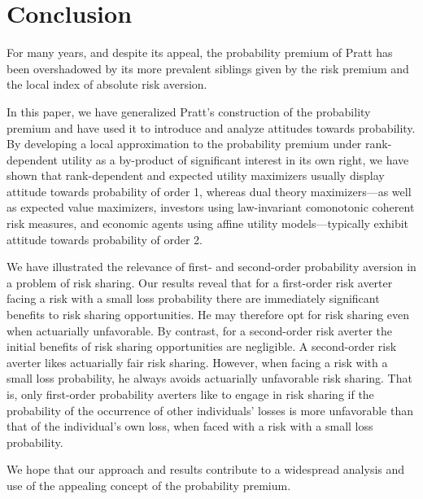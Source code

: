 \documentclass[11pt]{article}
\begin{document}
\setcounter{equation}{0}

\section{Conclusion}\label{sec:Con}

For many years, and despite its appeal, the probability premium of Pratt \cite{P64}
has been overshadowed by its more prevalent siblings
given by the risk premium and the local index of absolute risk aversion.

In this paper, we have generalized Pratt's construction of the probability premium
and have used it to introduce and analyze attitudes towards probability.
By developing a local approximation to the probability premium under rank-dependent utility
as a by-product of significant interest in its own right,
we have shown that rank-dependent and expected utility maximizers usually display
attitude towards probability of order 1,
whereas dual theory maximizers---as well as expected value maximizers,
investors using law-invariant comonotonic coherent risk measures,
and economic agents using affine utility models---typically exhibit attitude towards probability of order 2.

We have illustrated the relevance of first- and second-order probability aversion
in a problem of risk sharing.
Our results reveal that for a first-order risk averter facing a risk with a small loss probability
there are immediately significant benefits to risk sharing opportunities.
He may therefore opt for risk sharing even when actuarially unfavorable.
By contrast, for a second-order risk averter the initial benefits of risk sharing opportunities are negligible.
A second-order risk averter 
likes actuarially fair risk sharing.
However, when facing a risk with a small loss probability, he always avoids actuarially unfavorable risk sharing.
That is,
only first-order probability averters like to 
engage in risk sharing
if the probability of the occurrence of other individuals' losses is 
more unfavorable
than that of the individual's own loss,
when faced with a risk with a small loss probability. 

We hope that our approach and results contribute to 
a 
widespread analysis and use of the appealing concept of the probability premium.


\newpage
\end{document}
